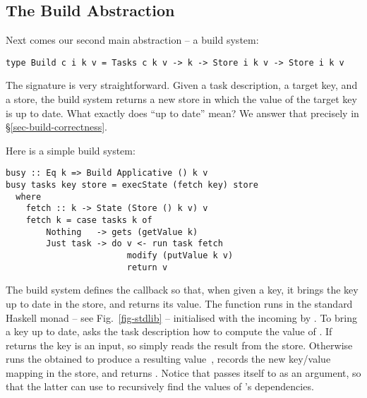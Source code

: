 \subsection{The Build Abstraction}\label{sec-general-build}

Next comes our second main abstraction -- a build system:

\vspace{0.5mm}
\begin{verbatim}
type Build c i k v = Tasks c k v -> k -> Store i k v -> Store i k v
\end{verbatim}
\vspace{0.5mm}

\noindent
The signature is very straightforward. Given a task description, a target key,
and a store, the build system returns a new store in which the value of the
target key is up to date. What exactly does ``up to date'' mean?  We answer
that precisely in \S\ref{sec-build-correctness}.

\noindent
Here is a simple build system:

\vspace{1mm}
\begin{verbatim}
busy :: Eq k => Build Applicative () k v
busy tasks key store = execState (fetch key) store
  where
    fetch :: k -> State (Store () k v) v
    fetch k = case tasks k of
        Nothing   -> gets (getValue k)
        Just task -> do v <- run task fetch
                        modify (putValue k v)
                        return v
\end{verbatim}
\vspace{1mm}

\noindent
The  build system defines the callback  so that, when given a
key, it brings the key up to date in the store, and returns its value.
The function  runs in the standard Haskell  monad -- see
Fig.~\ref{fig-stdlib} -- initialised with the incoming  by .
To bring a key up to date,  asks the task description  how
to compute the value of . If  returns  the key is an
input, so  simply reads the result from the store. Otherwise 
runs the obtained  to produce a resulting value~, records the new
key/value mapping in the store, and returns . Notice that 
passes itself to  as an argument, so that the latter can use 
to recursively find the values of 's dependencies.

